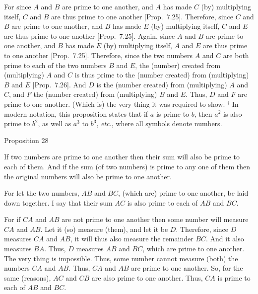 For since $A$ and $B$ are prime to one another, and $A$ has made $C$ (by)
multiplying itself, $C$ and $B$ are thus prime to one another [Prop.~7.25]. Therefore, since
$C$ and $B$ are prime to one another, and $B$ has made $E$ (by) multiplying itself,
$C$ and $E$ are thus prime to one another [Prop.~7.25].  Again, since $A$ and $B$ are prime to
one another, and $B$ has made $E$ (by) multiplying itself, $A$ and $E$ are thus
prime to one another [Prop.~7.25]. Therefore,
since the two numbers $A$ and $C$ are both prime to each of the two numbers
$B$ and $E$, the (number) created from (multiplying) $A$ and $C$ is thus
prime to the (number created) from (multiplying) $B$ and $E$ [Prop.~7.26]. And $D$ is the (number created)
from (multiplying) $A$ and $C$, and $F$ the (number created) from (multiplying)
$B$ and $E$. Thus, $D$ and $F$ are prime to one another. (Which is) the 
very thing it
was required to show.
{\footnotesize\noindent$^\dag$ In modern notation, this proposition
states that if $a$ is prime to $b$, then $a^2$ is also prime to $b^2$,
as well as $a^3$ to $b^3$, {\em etc.}, where all symbols denote numbers.}


\begin{center}
{\large Proposition 28}
\end{center}

If two numbers are prime to one another
then their sum will also be prime to each of them. And if the sum (of two numbers) is
prime to any one of them then the original numbers will also be prime
to one another.

\epsfysize=0.7in
\centerline{}

For let the two numbers, $AB$ and $BC$, (which are) prime to one another,
be laid down together. I say that their sum $AC$ is also prime to each of
$AB$ and $BC$.

For if $CA$ and $AB$ are not prime to one another then some number
will measure $CA$ and $AB$. Let it (so) measure (them), and let it be $D$.
Therefore, since $D$ measures $CA$ and $AB$, it will thus also measure the remainder
$BC$. And it also measures $BA$. Thus, $D$ measures $AB$ and $BC$, which are
prime to one another. The very thing is impossible. Thus, some number cannot measure (both) the numbers $CA$ and $AB$. Thus, $CA$ and $AB$ are prime to
one another. So, for the same (reasons), $AC$ and $CB$ are also prime to one another. Thus, $CA$ is prime to each of $AB$ and $BC$.


